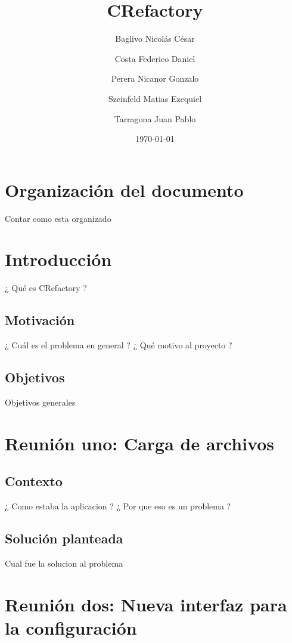 \documentclass[a4paper,oneside,10pt]{article}
\begin{document}

\title{CRefactory}
\author{Baglivo Nicolás César \and Costa Federico Daniel \and Perera Nicanor Gonzalo \and Szeinfeld Matias Ezequiel \and Tarragona Juan Pablo}
\date{\today}
\maketitle

\tableofcontents

\section{Organizaci\'on del documento}
Contar como esta organizado

\section{Introducción}
¿ Qu\'e es CRefactory ?

\subsection{Motivaci\'on}
¿ Cu\'al es el problema en general ? ¿ Qu\'e motivo al proyecto ?

\subsection{Objetivos}
Objetivos generales

\section{Reuni\'on uno: Carga de archivos}

\subsection{Contexto}
¿ Como estaba la aplicacion ? ¿ Por que eso es un problema ?

\subsection{Soluci\'on planteada}
Cual fue la solucion al problema

\section{Reuni\'on dos: Nueva interfaz para la configuraci\'on}
\end{document}

